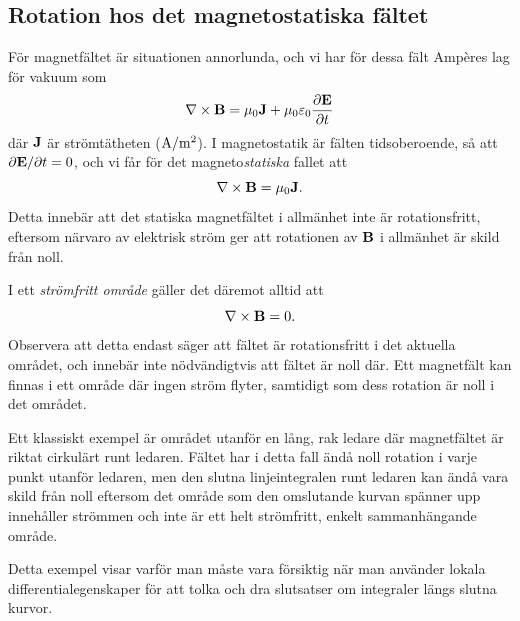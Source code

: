 \subsection{Rotation hos det magnetostatiska f{\"a}ltet}
F{\"o}r magnetf{\"a}ltet {\"a}r situationen annorlunda, och vi har f{\"o}r
dessa f{\"a}lt Amp{\`e}res lag f{\"o}r vakuum som
$$
  \nabla\times{\bf B}
    =\mu_0{\bf J}+\mu_0\varepsilon_0{{\partial{\bf E}}\over{\partial t}}
$$
d{\"a}r ${\bf J}$ {\"a}r str{\"o}mt{\"a}theten (${\rm A}/{\rm m}^2$).
I magnetostatik {\"a}r f{\"a}lten tidsoberoende, s{\aa} att
$\partial{\bf E}/\partial t=0$, och vi f{\aa}r f{\"o}r det
magneto{\it statiska} fallet att
$$
  \nabla\times{\bf B}=\mu_0{\bf J}.
$$
Detta inneb{\"a}r att det statiska magnetf{\"a}ltet i allm{\"a}nhet inte {\"a}r
rotationsfritt, eftersom n{\"a}rvaro av elektrisk str{\"o}m ger att rotationen
av ${\bf B}$ i allm{\"a}nhet {\"a}r skild fr{\aa}n noll.

I ett {\it str{\"o}mfritt omr{\aa}de} g{\"a}ller det d{\"a}remot alltid att
$$
  \nabla\times{\bf B}=0.
$$
Observera att detta endast s{\"a}ger att f{\"a}ltet {\"a}r rotationsfritt i det
aktuella omr{\aa}det, och inneb{\"a}r inte n{\"o}dv{\"a}ndigtvis att f{\"a}ltet
{\"a}r noll d{\"a}r. Ett magnetf{\"a}lt kan finnas i ett omr{\aa}de d{\"a}r
ingen str{\"o}m flyter, samtidigt som dess rotation {\"a}r noll i det
omr{\aa}det.

Ett klassiskt exempel {\"a}r omr{\aa}det utanf{\"o}r en l{\aa}ng, rak ledare
d{\"a}r magnetf{\"a}ltet {\"a}r riktat cirkul{\"a}rt runt ledaren.
F{\"a}ltet har i detta fall {\"a}nd{\aa} noll rotation i varje punkt
utanf{\"o}r ledaren, men den slutna linjeintegralen runt ledaren kan
{\"a}nd{\aa} vara skild fr{\aa}n noll eftersom det omr{\aa}de som den
omslutande kurvan sp{\"a}nner upp inneh{\aa}ller str{\"o}mmen och inte
{\"a}r ett helt str{\"o}mfritt, enkelt sammanh{\"a}ngande omr{\aa}de.

Detta exempel visar varf{\"o}r man m{\aa}ste vara f{\"o}rsiktig n{\"a}r man
anv{\"a}nder lokala differentialegenskaper f{\"o}r att tolka och dra slutsatser
om integraler l{\"a}ngs slutna kurvor.


